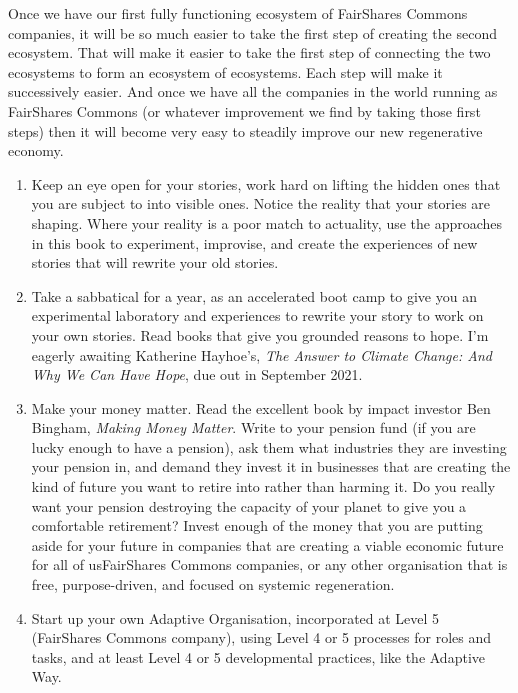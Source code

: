 Once we have our first fully functioning ecosystem of FairShares Commons companies, it will be so much easier to take the first step of creating the second ecosystem. That will make it easier to take the first step of connecting the two ecosystems to form an ecosystem of ecosystems. Each step will make it successively easier. And once we have all the companies in the world running as FairShares Commons (or whatever improvement we find by taking those first steps) then it will become very easy to steadily improve our new regenerative economy.


\begin{enumerate}
\item Keep an eye open for your stories, work hard on lifting the hidden ones that you are subject to into visible ones. Notice the reality that your stories are shaping. Where your reality is a poor match to actuality, use the approaches in this book to experiment, improvise, and create the experiences of new stories that will rewrite your old stories.     


\item Take a sabbatical for a year, as an accelerated boot camp to give you an experimental laboratory and experiences to rewrite your story to work on your own stories. Read books that give you grounded reasons to hope. I’m eagerly awaiting Katherine Hayhoe’s, \emph{The Answer to Climate Change: And Why We Can Have Hope}\cite{hayhoe-hope}, due out in September 2021. 


\item Make your money matter. Read the excellent book by impact investor Ben Bingham, \emph{Making Money Matter}\cite{bingham-money}. Write to your pension fund (if you are lucky enough to have a pension), ask them what industries they are investing your pension in, and demand they invest it in businesses that are creating the kind of future you want to retire into rather than harming it. Do you really want your pension destroying the capacity of your planet to give you a comfortable retirement? Invest enough of the money that you are putting aside for your future in companies that are creating a viable economic future for all of us\textemdash FairShares Commons companies, or any other organisation that is free, purpose-driven, and focused on systemic regeneration. 


\item Start up your own Adaptive Organisation,  incorporated at Level 5 (FairShares Commons company), using Level 4 or 5 processes for roles and tasks, and at least Level 4 or 5 developmental practices, like the Adaptive Way.



\end{enumerate}
